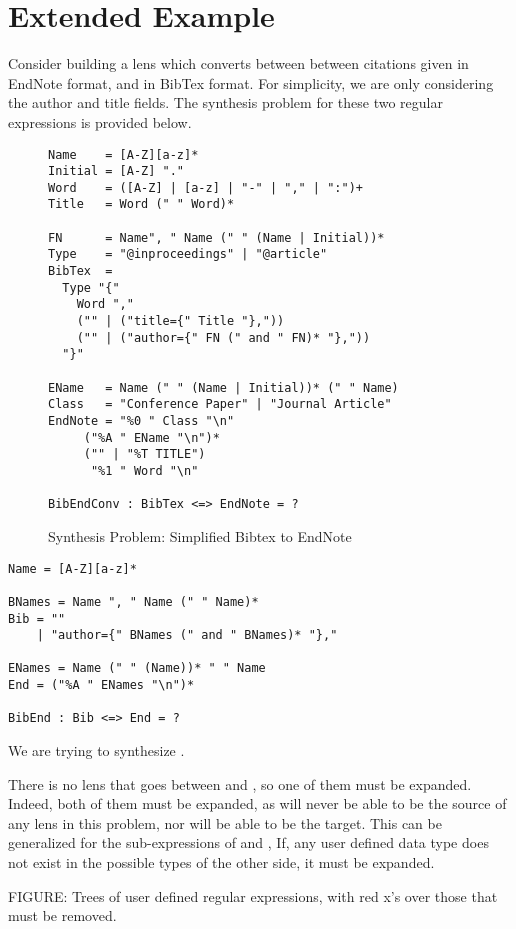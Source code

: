 \section{Extended Example}

Consider building a lens which converts between between citations given
in EndNote format, and in BibTex format.  For simplicity, we are only
considering the author and title fields.  The synthesis problem for these
two regular expressions is provided below.

\begin{figure}
\begin{lstlisting}
Name    = [A-Z][a-z]*
Initial = [A-Z] "."
Word    = ([A-Z] | [a-z] | "-" | "," | ":")+
Title   = Word (" " Word)*

FN      = Name", " Name (" " (Name | Initial))*
Type    = "@inproceedings" | "@article"
BibTex  = 
  Type "{" 
    Word ","
    ("" | ("title={" Title "},"))
    ("" | ("author={" FN (" and " FN)* "},")) 
  "}"

EName   = Name (" " (Name | Initial))* (" " Name)
Class   = "Conference Paper" | "Journal Article"
EndNote = "%0 " Class "\n"
	 ("%A " EName "\n")*
	 ("" | "%T TITLE")
	  "%1 " Word "\n"

BibEndConv : BibTex <=> EndNote = ?
\end{lstlisting}
\caption{Synthesis Problem: Simplified Bibtex to EndNote}
\end{figure}

\begin{lstlisting}
Name = [A-Z][a-z]*

BNames = Name ", " Name (" " Name)*
Bib = ""
    | "author={" BNames (" and " BNames)* "},"

ENames = Name (" " (Name))* " " Name
End = ("%A " ENames "\n")*

BibEnd : Bib <=> End = ?
\end{lstlisting}


We are trying to synthesize \BibEndConv{}.

There is no lens that goes between \BibTex{} and \EndNote{}, so one of them must
be expanded.
Indeed, both of them must be expanded, as \BibTex{} will never be able to be
the source of any lens in this problem, nor will \EndNote{} be able to be the
target.
This can be generalized for the sub-expressions of \BibTex{} and \EndNote{},  
If, any user defined data type does not exist in the possible types of the
other side, it must be expanded.

FIGURE:
Trees of user defined regular expressions, with red x's over those that must be
removed.

